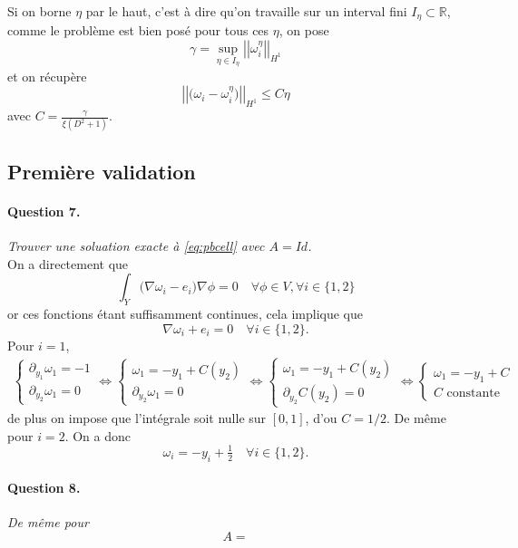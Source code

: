 \message{ !name(rapport.tex)}\documentclass[11pt]{article}
\newcommand{\R}{\mathbb{R}}
\newcommand{\norm}[1]{\left|\left|#1\right|\right|}
\newcommand{\question}[2]{\paragraph{Question #1.}\textit{#2} \\}
\begin{document}
Si on borne $\eta$ par le haut, c'est à dire qu'on travaille sur un interval fini $I_\eta \subset  \R$, comme le problème est bien posé pour tous ces $\eta$, on pose
\begin{equation}
  \gamma = \sup_{\eta\in I_\eta}\norm{\omega_i^\eta}_{H^1}
\end{equation}
et on récupère 
\begin{equation}
  \norm{\big(\omega_i-\omega_i^\eta \big)}_{H^1} \leq C \eta 
\end{equation}
avec $C = \frac{\gamma}{\xi (D^2+1)}$.


\subsection{Première validation}

\question{7}{Trouver une soluation exacte à \autoref{eq:pbcell} avec $A=Id$.}
On a directement que
\begin{equation}
  \int_Y \big(\nabla \omega_i-e_i\big) \nabla \phi = 0 \quad \forall \phi \in V, \forall i \in \{1,2\}
\end{equation}
or ces fonctions étant suffisamment continues, cela implique que
\begin{equation}
  \nabla \omega_i+e_i = 0 \quad \forall i \in \{1,2\}.
\end{equation}
Pour $i=1$,
\begin{align}
  \begin{cases}
    \partial_{y_1} \omega_1 = -1 \\
    \partial_{y_2} \omega_1 = 0
  \end{cases} \iff
  \begin{cases}
    \omega_1 = - y_1 + C(y_2) \\
    \partial_{y_2} \omega_1 = 0 
  \end{cases} \iff
  \begin{cases}
    \omega_1 = - y_1 + C(y_2) \\
    \partial_{y_2} C(y_2) = 0 
  \end{cases} \iff
  \begin{cases}
    \omega_1 = - y_1 + C \\
    C \text{ constante}
  \end{cases}
\end{align}
de plus on impose que l'intégrale soit nulle sur $[0,1]$, d'ou $C=1/2$. De même pour $i=2$. On a donc
\begin{equation}
  \omega_i = - y_i + \tfrac{1}{2} \quad \forall i \in \{1,2\}.
\end{equation}

\question{8}{De même pour \[ A = \]}

\end{document}
